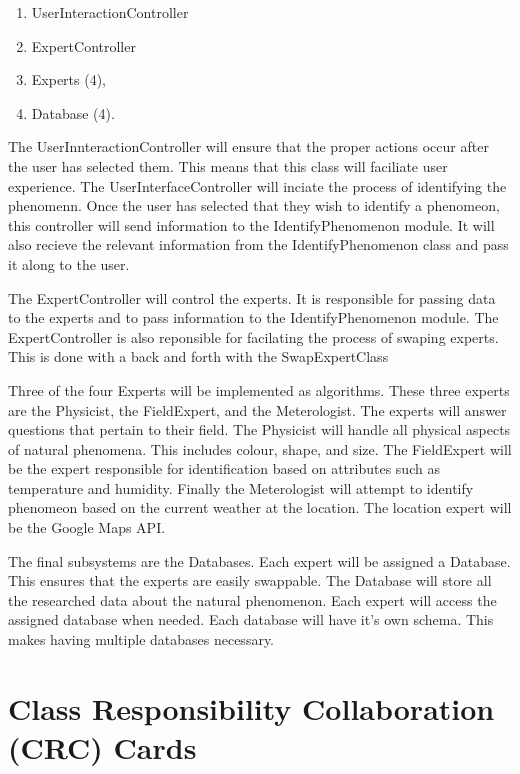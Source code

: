 \documentclass[]{article}
\begin{document}
\begin{enumerate}
	\item UserInteractionController
	\item ExpertController 
	\item Experts (4),
	\item Database (4).
\end{enumerate}

 The UserInnteractionController will ensure that the proper actions occur after the user has selected them. This means that this class will faciliate user experience. The UserInterfaceController will inciate the process of identifying the phenomenn. Once the user has selected that they wish to identify a phenomeon, this controller will send information to the IdentifyPhenomenon module. It will also recieve the relevant information from the IdentifyPhenomenon class and pass it along to the user.
 
 The ExpertController will control the experts. It is responsible for passing data to the experts and to pass information to the IdentifyPhenomenon module. The ExpertController is also reponsible for facilating the process of swaping experts. This is done with a back and forth with the SwapExpertClass

Three of the four Experts will be implemented as algorithms. These three experts are the Physicist, the FieldExpert, and the Meterologist. The experts will answer questions that pertain to their field. The Physicist will handle all physical aspects of natural phenomena. This includes colour, shape, and size. The FieldExpert will be the expert responsible for identification based on attributes such as temperature and humidity. Finally the Meterologist will attempt to identify phenomeon based on the current weather at the location. The location expert will be the Google Maps API.

The final subsystems are the Databases. Each expert will be assigned a Database. This ensures that the experts are easily swappable. The Database will store all the researched data about the natural phenomenon. Each expert will access the assigned database when needed. Each database will have it's own schema. This makes having multiple databases necessary.   



	
\section{Class Responsibility Collaboration (CRC) Cards}
\label{sec:class_responsibility_collaboration_crc_cards}
\end{document}

